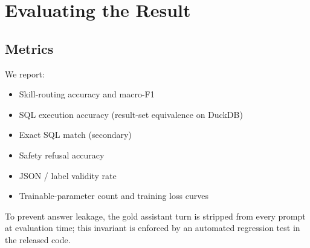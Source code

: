 \documentclass[conference]{IEEEtran}
\begin{document}
\section{Evaluating the Result}
\label{sec:results}
\subsection{Metrics}
We report:
\begin{itemize}
\item Skill-routing accuracy and macro-F1
\item SQL execution accuracy (result-set equivalence on DuckDB)
\item Exact SQL match (secondary)
\item Safety refusal accuracy
\item JSON / label validity rate
\item Trainable-parameter count and training loss curves
\end{itemize}
To prevent answer leakage, the gold assistant turn is stripped from every prompt at evaluation time; this invariant is enforced by an automated regression test in the released code.
\end{document}
